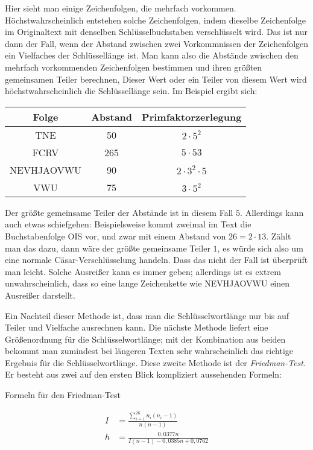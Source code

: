 \documentclass{zusammenfassung}
\begin{document}
Hier sieht man einige Zeichenfolgen, die mehrfach vorkommen. Höchstwahrscheinlich entstehen solche Zeichenfolgen, indem dieselbe
Zeichenfolge im Originaltext mit denselben Schlüsselbuchstaben verschlüsselt wird. Das ist nur dann der Fall, wenn der Abstand
zwischen zwei Vorkommnissen der Zeichenfolgen ein Vielfaches der Schlüssellänge ist. Man kann also die Abstände zwischen den
mehrfach vorkommenden Zeichenfolgen bestimmen und ihren größten gemeinsamen Teiler berechnen, Dieser Wert oder ein Teiler von
diesem Wert wird höchstwahrscheinlich die Schlüssellänge sein. Im Beispiel ergibt sich:

\begin{center}
  \begin{tabular}{ccc}
    \toprule
    \bf Folge&\bf Abstand&\bf Primfaktorzerlegung\\
    \midrule
    TNE&50&$2\cdot 5^2$\\
    FCRV&265&$5\cdot 53$\\
    NEVHJAOVWU&90&$2\cdot 3^2\cdot 5$\\
    VWU&75&$3\cdot 5^2$\\
    \bottomrule
  \end{tabular}
\end{center}

Der größte gemeinsame Teiler der Abstände ist in diesem Fall $5$. Allerdings kann auch etwas schiefgehen: Beispielsweise kommt
zweimal im Text die Buchstabenfolge OIS vor, und zwar mit einem Abstand von $26=2\cdot 13$. Zählt man das dazu, dann wäre der
größte gemeinsame Teiler $1$, es würde sich also um eine normale Cäsar-Verschlüsselung handeln. Dass das nicht der Fall ist
überprüft man leicht. Solche Ausreißer kann es immer geben; allerdings ist es extrem unwahrscheinlich, dass so eine lange
Zeichenkette wie NEVHJAOVWU einen Ausreißer darstellt.

Ein Nachteil dieser Methode ist, dass man die Schlüsselwortlänge nur bis auf Teiler und Vielfache ausrechnen kann. Die nächste
Methode liefert eine Größenordnung für die Schlüsselwortlänge; mit der Kombination aus beiden bekommt man zumindest bei längeren
Texten sehr wahrscheinlich das richtige Ergebnis für die Schlüsselwortlänge. Diese zweite Methode ist der \emph{Friedman-Test}. Er
besteht aus zwei auf den ersten Blick kompliziert aussehenden Formeln:

\begin{table}[h]
  \caption{Formeln für den Friedman-Test}
  \begin{center}
    \begin{align*}
      I&=\frac{\sum_{i=1}^{26}n_i(n_i-1)}{n(n-1)}\tag{Koinzidenzindex}\\
      h&=\frac{0{,}0377n}{I(n-1)-0{,}0385n+0{,}0762}\tag{Schlüsselwortlänge}
    \end{align*}
  \end{center}
\end{table}
\end{document}
